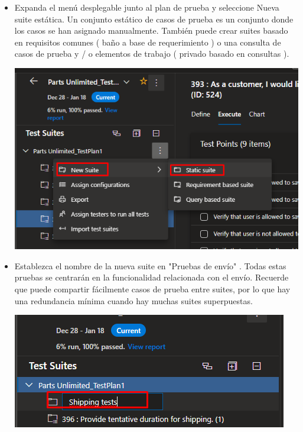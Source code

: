 \begin{itemize}

\item Expanda el menú desplegable junto al plan de prueba y seleccione Nueva suite estática. Un conjunto estático de casos de prueba es un conjunto donde los casos se han asignado manualmente. También puede crear suites basado en requisitos comunes ( baño a base de requerimiento ) o una consulta de casos de prueba y / o elementos de trabajo ( privado basado en consultas ).
\begin{center}
\includegraphics[width=\columnwidth]{images/16}\newline
\end{center}

\item Establezca el nombre de la nueva suite en "Pruebas de envío" . Todas estas pruebas se centrarán en la funcionalidad relacionada con el envío. Recuerde que puede compartir fácilmente casos de prueba entre suites, por lo que hay una redundancia mínima cuando hay muchas suites superpuestas.
\begin{center}
\includegraphics[width=\columnwidth]{images/17}\newline
\end{center}


\end{itemize}
